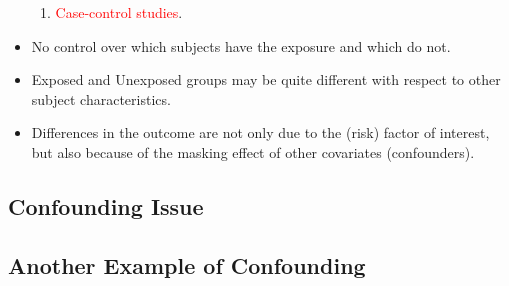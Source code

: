 \begin{itemize}
\begin{enumerate}
              \item \textcolor{Red}{Case-control studies}.
          \end{enumerate}
    \item No control over which subjects have the exposure and which
          do not.
    \item Exposed and Unexposed groups may be quite different with
          respect to other subject characteristics.
    \item Differences in the outcome are not only due to the (risk)
          factor of interest, but also because of the masking effect of
          other covariates (confounders).
\end{itemize}
\subsection*{Confounding Issue}
\begin{figure}[H]
    \centering
\end{figure}
\subsection*{Another Example of Confounding}
\begin{figure}[H]
    \centering
\end{figure}
